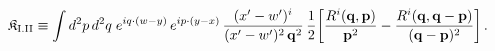 \begin{align}\label{eq:K-rm_I_II}
&\mathfrak{K}_{\rm I.II}\equiv \int d^{2}p\, d^{2}q\;e^{iq\cdot(w-y)}\, e^{ip\cdot(y-x)}\, \frac{(x'-w')^{i}}{(x'-w')^{2}\,\mathbf{q}^{2}}\, \frac{1}{2}\bigg[\frac{R^{i}(\mathbf{q},\mathbf{p})}{\mathbf{p}^{2}} -\frac{R^{i}(\mathbf{q},\mathbf{q}-\mathbf{p})}{(\mathbf{q}-\mathbf{p})^{2}}\bigg]\,.
\end{align}
